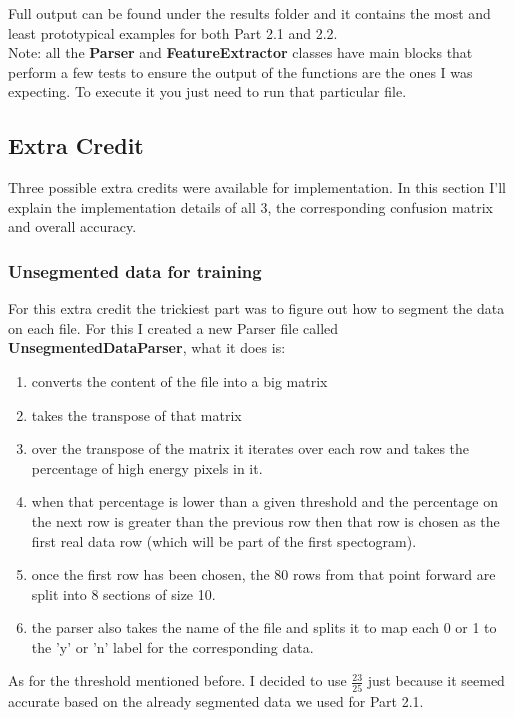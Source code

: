 \documentclass[11pt]{article}
\begin{document}
Full output can be found under the results folder and it contains the most and least prototypical examples for both Part 2.1 and 2.2.\\

Note: all the \textbf{Parser} and \textbf{FeatureExtractor} classes have main blocks that perform a few tests to ensure the output of the functions are the ones I was expecting. To execute it you just need to run that particular file.

\subsection*{Extra Credit}
Three possible extra credits were available for implementation. In this section I'll explain the implementation details of all 3, the corresponding confusion matrix and overall accuracy.

\subsubsection*{Unsegmented data for training}
For this extra credit the trickiest part was to figure out how to segment the data on each file. For this I created a new Parser file called \textbf{UnsegmentedDataParser}, what it does is:
\begin{enumerate}
\item converts the content of the file into a big matrix
\item takes the transpose of that matrix
\item over the transpose of the matrix it iterates over each row and takes the percentage of high energy pixels in it. 
\item when that percentage is lower than a given threshold and the percentage on the next row is greater than the previous row then that row is chosen as the first real data row (which will be part of the first spectogram). 
\item once the first row has been chosen, the 80 rows from that point forward are split into 8 sections of size 10. 
\item the parser also takes the name of the file and splits it to map each 0 or 1 to the 'y' or 'n' label for the corresponding data.
\end{enumerate}

As for the threshold mentioned before. I decided to use $\frac{23}{25}$ just because it seemed accurate based on the already segmented data we used for Part 2.1. \\
\end{document}
